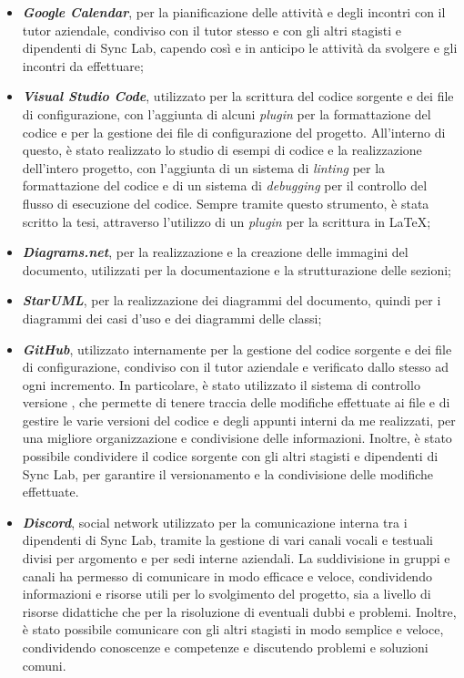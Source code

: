 \begin{itemize}
    \item{\textit{\textbf{Google Calendar}}}, per la pianificazione delle attività e degli incontri con il tutor aziendale, condiviso con il tutor stesso e con gli altri stagisti 
    e dipendenti di Sync Lab, capendo così e in anticipo le attività da svolgere e gli incontri da effettuare;
    
    \item{\textit{\textbf{Visual Studio Code}}},  utilizzato per la scrittura del codice sorgente e dei file di configurazione, con l'aggiunta di alcuni \textit{plugin} per la formattazione del codice e per la gestione dei file di configurazione 
    del progetto. All'interno di questo, è stato realizzato lo studio di esempi di codice e la realizzazione dell'intero progetto, con l'aggiunta di un sistema di \textit{linting} per la formattazione del codice e di un sistema di \textit{debugging} per il controllo del flusso di esecuzione del codice.
    Sempre tramite questo strumento, è stata scritto la tesi, attraverso l'utilizzo di un \textit{plugin} per la scrittura in \LaTeX;
    
    \item{\textit{\textbf{Diagrams.net}}}, per la realizzazione e la creazione delle immagini del documento, utilizzati per la documentazione e la strutturazione delle sezioni;
    
    \item{\textit{\textbf{StarUML}}}, per la realizzazione dei diagrammi  del documento, quindi per i diagrammi dei casi d'uso e dei diagrammi delle classi;

    \item{\textit{\textbf{GitHub}}}, utilizzato internamente per la gestione del codice sorgente e dei file di configurazione, condiviso con il tutor aziendale e verificato dallo stesso ad ogni incremento.
    In particolare, è stato utilizzato il sistema di controllo versione , che permette di tenere traccia delle modifiche effettuate ai file e di gestire le varie versioni del codice e degli appunti interni 
    da me realizzati, per una migliore organizzazione e condivisione delle informazioni. Inoltre, è stato possibile condividere il codice sorgente con gli altri stagisti e dipendenti di Sync Lab,
    per garantire il versionamento e la condivisione delle modifiche effettuate.
    
    \item{\textit{\textbf{Discord}}}, social network utilizzato per la comunicazione interna tra i dipendenti di Sync Lab, 
    tramite la gestione di vari canali vocali e testuali divisi per argomento e per sedi interne aziendali. La suddivisione in gruppi e canali
    ha permesso di comunicare in modo efficace e veloce, condividendo informazioni e risorse utili per lo svolgimento del progetto, sia a livello di risorse 
    didattiche che per la risoluzione di eventuali dubbi e problemi. Inoltre, è stato possibile comunicare con gli altri stagisti in modo semplice e veloce,
    condividendo conoscenze e competenze e discutendo problemi e soluzioni comuni.
\end{itemize}

